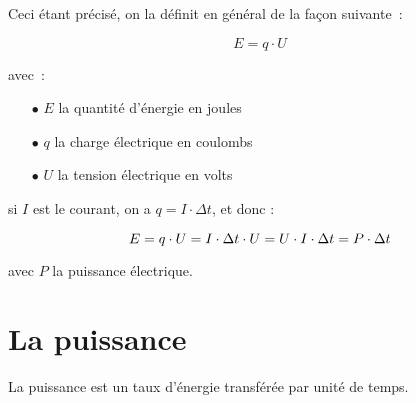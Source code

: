 Ceci étant précisé, on la définit en général de la façon suivante~:

\begin{equation}
	E = q \cdot U
\end{equation}

avec~:
\begin{itemize}
	\item[$\bullet$] $E$ la quantité d'énergie en joules
	\item[$\bullet$] $q$ la charge électrique en coulombs
	\item[$\bullet$] $U$ la tension électrique en volts \\
\end{itemize}

si $I$ est le courant, on a $q = I \cdot \Delta t$, et donc :

\begin{equation}
	E = q \cdot U \\
	  = I \cdot \Delta t \cdot U \\
	  = U \cdot I \cdot \Delta t \\
	  = P \cdot \Delta t \\
\end{equation}

avec $P$ la puissance électrique.\\

\section{La puissance}

La puissance est un taux d'énergie transférée par unité de temps.



